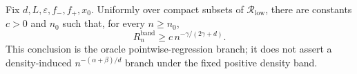 Fix \(d,L,\varepsilon,f_{-},f_{+},x_0\).  Uniformly over compact subsets of \(\mathcal R_{\mathrm{low}}\), there are constants \(c>0\) and \(n_0\) such that, for every \(n\geq n_0\),
\[
R_n^{\mathrm{band}}\geq c\,n^{-\gamma/(2\gamma+d)}.
\]
This conclusion is the oracle pointwise-regression branch; it does not assert a density-induced \(n^{-(\alpha+\beta)/d}\) branch under the fixed positive density band.